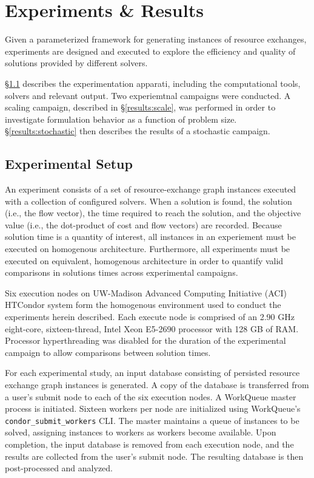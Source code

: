 \chapter{Experiments \& Results}\label{ch:results}

Given a parameterized framework for generating instances of resource exchanges,
experiments are designed and executed to explore the efficiency and quality of
solutions provided by different solvers. 

\S \ref{results:setup} describes the experimentation apparati, including the
computational tools, solvers and relevant output. Two experiemtnal campaigns
were conducted. A scaling campaign, described in \S \ref{results:scale}, was
performed in order to investigate formulation behavior as a function of problem
size. \S \ref {results:stochastic} then describes the results of a stochastic
campaign.

\section{Experimental Setup}\label{results:setup}

An experiment consists of a set of resource-exchange graph instances executed
with a collection of configured solvers. When a solution is found, the solution
(i.e., the flow vector), the time required to reach the solution, and the
objective value (i.e., the dot-product of cost and flow vectors) are
recorded. Because solution time is a quantity of interest, all instances in an
experiement must be executed on homogenous architecture. Furthermore, all
experiments must be executed on equivalent, homogenous architecture in order to
quantify valid comparisons in solutions times across experimental campaigns.

Six execution nodes on UW-Madison Advanced Computing Initiative (ACI) HTCondor
system form the homogenous environment used to conduct the experiments herein
described. Each execute node is comprised of an 2.90 GHz eight-core,
sixteen-thread, Intel Xeon E5-2690 \cite{intelproc} processor with 128 GB of
RAM. Processor hyperthreading was disabled for the duration of the experimental
campaign to allow comparisons between solution times.

For each experimental study, an input database consisting of persisted resource
exchange graph instances is generated. A copy of the database is transferred
from a user's submit node to each of the six execution nodes. A WorkQueue master
process is initiated. Sixteen workers per node are initialized using WorkQueue's
\texttt{condor\_submit\_workers} CLI. The master maintains a queue of instances
to be solved, assigning instances to workers as workers become available. Upon
completion, the input database is removed from each execution node, and the
results are collected from the user's submit node. The resulting database is
then post-processed and analyzed.

